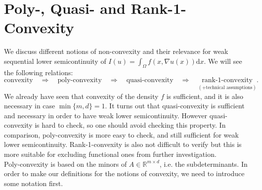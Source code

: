 \section{Poly-, Quasi- and Rank-1-Convexity}

We discuss different notions of non-convexity and their relevance for weak sequential lower semicontinuity of $I(u)=\int_\Omega{f(x,\nabla u(x))\mathrm{d}x}$. We will see the following relations:
\[\text{convexity}\quad\Rightarrow\quad\text{poly-convexity}\quad\Rightarrow\quad\text{quasi-convexity}\quad\Rightarrow\quad\underset{(\text{+technical assumptions})}{\text{rank-1-convexity}}.\]
We already have seen that convexity of the density $f$ is sufficient, and it is also necessary in case $\min\{m,d\}=1$. It turns out that quasi-convexity is sufficient and necessary in order to have weak lower semicontinuity. However quasi-convexity is hard to check, so one should avoid checking this property. In comparison, poly-convexity is more easy to check, and still sufficient for weak lower semicontinuity. Rank-1-convexity is also not difficult to verify but this is more suitable for excluding functional ones from further investigation.\\

Poly-convexity is based on the minors of $A\in\mathbb{R}^{m\times d}$, i.e. the subdeterminants. In order to make our definitions for the notions of convexity, we need to introduce some notation first.\\[11pt]

